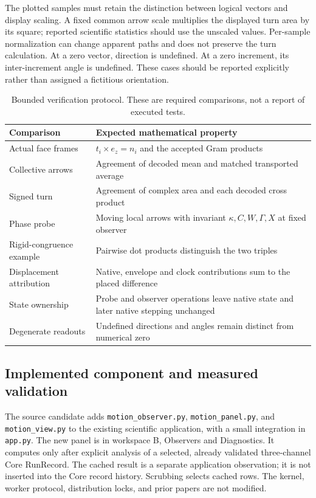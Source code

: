 \documentclass[11pt,a4paper]{article}
\numberwithin{equation}{section}
\theoremstyle{definition}
\theoremstyle{remark}
\begin{document}
The plotted samples must retain the distinction between logical vectors
and display scaling. A fixed common arrow scale multiplies the displayed
turn area by its square; reported scientific statistics should use the
unscaled values. Per-sample normalization can change apparent paths and
does not preserve the turn calculation. At a zero vector, direction is
undefined. At a zero increment, its inter-increment angle is undefined.
These cases should be reported explicitly rather than assigned a fictitious
orientation.

\begin{table}[htbp]
\centering\small
\caption{Bounded verification protocol. These are required comparisons,
not a report of executed tests.}
\begin{tabularx}{\linewidth}{@{}p{.31\linewidth}X@{}}
\toprule
Comparison & Expected mathematical property\\\midrule
Actual face frames & $t_i\times e_z=n_i$ and the accepted Gram products\\
Collective arrows & Agreement of decoded mean and matched transported average\\
Signed turn & Agreement of complex area and each decoded cross product\\
Phase probe & Moving local arrows with invariant $\kappa,C,W,\Gamma,X$ at fixed observer\\
Rigid-congruence example & Pairwise dot products distinguish the two triples\\
Displacement attribution & Native, envelope and clock contributions sum to the placed difference\\
State ownership & Probe and observer operations leave native state and later native stepping unchanged\\
Degenerate readouts & Undefined directions and angles remain distinct from numerical zero\\
\bottomrule
\end{tabularx}
\end{table}

\subsection{Implemented component and measured validation}
The source candidate adds \texttt{motion\_observer.py},
\texttt{motion\_panel.py}, and \texttt{motion\_view.py} to the existing
scientific application, with a small integration in \texttt{app.py}. The
new panel is in workspace B, Observers and Diagnostics. It computes only
after explicit analysis of a selected, already validated three-channel
Core RunRecord. The cached result is a separate application observation;
it is not inserted into the Core record history. Scrubbing selects cached
rows. The kernel, worker protocol, distribution locks, and prior papers
are not modified.
\end{document}
